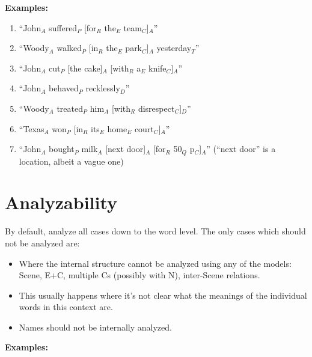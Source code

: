 \documentclass[11pt]{article}
\begin{document}
\noindent
{\bf Examples:}

\begin{enumerate}
\item
``John$_A$ suffered$_P$ [for$_R$ the$_E$ team$_C$]$_A$''
\item
``Woody$_A$ walked$_P$ [in$_R$ the$_E$ park$_C$]$_A$ yesterday$_T$''
\item
``John$_A$ cut$_P$ [the cake]$_A$ [with$_R$ a$_E$ knife$_C$]$_A$''
\item
``John$_A$ behaved$_P$ recklessly$_D$''
\item
``Woody$_A$ treated$_P$ him$_A$ [with$_R$ disrespect$_C$]$_D$''
\item
``Texas$_A$ won$_P$ [in$_R$ its$_E$ home$_E$ court$_C$]$_A$''
\item
``John$_A$ bought$_P$ milk$_A$ [next door]$_A$ [for$_R$ 50$_Q$ p$_C$]$_A$'' (``next door'' is a location, albeit a vague one)
\end{enumerate}


\section{Analyzability}

By default, analyze all cases down to the word level.
The only cases which should not be analyzed are:

\begin{itemize}
\item
Where the internal structure cannot be analyzed using any of the models: Scene, E+C, multiple Cs (possibly with N), inter-Scene relations.
\item
This usually happens where it's not clear what the meanings of the individual words in this context are.
\item
Names should not be internally analyzed.
\end{itemize}

\noindent
{\bf Examples:}
\end{document}

